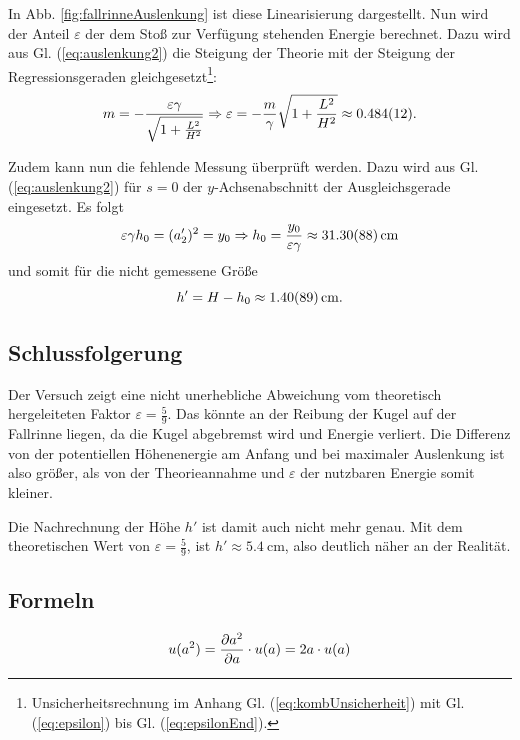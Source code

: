 	In Abb. \ref{fig:fallrinneAuslenkung} ist diese Linearisierung dargestellt.
	Nun wird der Anteil $\varepsilon$ der dem Stoß zur Verfügung stehenden Energie berechnet.
	Dazu wird aus Gl. (\ref{eq:auslenkung2}) die Steigung der Theorie mit der Steigung der Regressionsgeraden gleichgesetzt\footnote{Unsicherheitsrechnung im Anhang Gl. (\ref{eq:kombUnsicherheit}) mit Gl. (\ref{eq:epsilon}) bis Gl. (\ref{eq:epsilonEnd}).}:
	\begin{equation}
		m = -\frac{\varepsilon \gamma}{\sqrt{1 + \frac{L^2}{H^2}}} \Rightarrow \varepsilon = -\frac{m}{\gamma} \sqrt{1+\frac{L^2}{H^2}} \approx \SI{0,484 +- 0,012}{}.
	\end{equation}
	
	Zudem kann nun die fehlende Messung überprüft werden.
	Dazu wird aus Gl. (\ref{eq:auslenkung2}) für $s = 0$ der $y$-Achsenabschnitt der Ausgleichsgerade eingesetzt.
	Es folgt
	\begin{equation}
		\varepsilon \gamma h_0 = (a'_2)^2= y_0 \Rightarrow h_0 = \frac{y_0}{\varepsilon\gamma} \approx \SI{31,30 +- 0,88}{\centi\meter}
	\end{equation}
	und somit für die nicht gemessene Größe
	\begin{equation}
		h' = H - h_0 \approx \SI{1,40 +- 0,89}{\centi\meter}.
	\end{equation}
	
	\subsection{Schlussfolgerung}
	
	Der Versuch zeigt eine nicht unerhebliche Abweichung vom theoretisch hergeleiteten Faktor $\varepsilon = \frac{5}{9}$.
	Das könnte an der Reibung der Kugel auf der Fallrinne liegen, da die Kugel abgebremst wird und Energie verliert.
	Die Differenz von der potentiellen Höhenenergie am Anfang und bei maximaler Auslenkung ist also größer, als von der Theorieannahme und $\varepsilon$ der nutzbaren Energie somit kleiner.
	
	Die Nachrechnung der Höhe $h'$ ist damit auch nicht mehr genau.
	Mit dem theoretischen Wert von $\varepsilon = \frac{5}{9}$, ist $h' \approx \SI{5,4}{\centi\meter}$, also deutlich näher an der Realität.
	
	\subsection{Formeln}
	\begin{equation}
	\label{eq:unce_auslenkung2}
	u(a^2) = \pdv{a^2}{a} \cdot u(a) = 2 a \cdot u(a)
	\end{equation}
	
